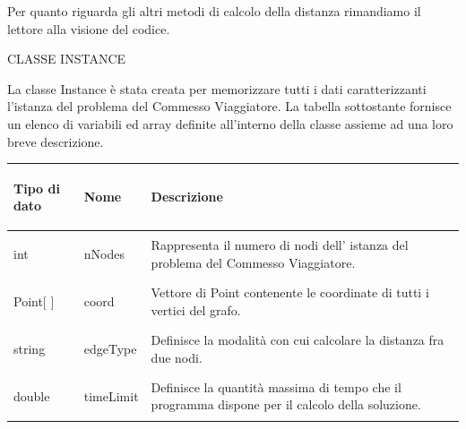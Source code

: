 \documentclass[11pt]{article}
\begin{document}
Per quanto riguarda gli altri metodi di calcolo della distanza rimandiamo il lettore alla visione del codice.

\vspace{2\baselineskip}
CLASSE INSTANCE
\vspace{2\baselineskip}

La classe Instance \`e stata creata per memorizzare tutti i dati caratterizzanti l'istanza del problema del Commesso Viaggiatore. La tabella sottostante fornisce un elenco di variabili ed array definite all'interno della classe assieme ad una loro breve descrizione. 


\begin{center}

    \begin{longtable}{ | p{4cm} | p{4cm} | p{7cm} |}
    \hline
    \begin{center} \textbf{Tipo di dato} \end{center} & \begin{center}  \textbf{Nome} \end{center}& 
    \begin{center} \textbf{Descrizione} \end{center}\\ \hline
    \begin{center} int \end{center} & \begin{center} nNodes \end{center}& \vfill Rappresenta il numero di nodi dell' istanza del problema del Commesso Viaggiatore.\vfill \\ \hline
    \begin{center} Point[ ] \end{center} & \begin{center} coord \end{center}& \vfill Vettore di Point contenente le coordinate di tutti i vertici del grafo.\vfill\\ \hline
    \begin{center} string \end{center} & \begin{center} edgeType \end{center}&\vfill Definisce la modalit\`a con cui calcolare la distanza fra due nodi.\vfill \\ \hline
    \begin{center} double \end{center} & \begin{center} timeLimit \end{center}& \vfill Definisce la quantit\`a massima di tempo che il programma dispone per il calcolo della soluzione.\vfill \\ \hline

\end{longtable}
\end{center}
\end{document}
